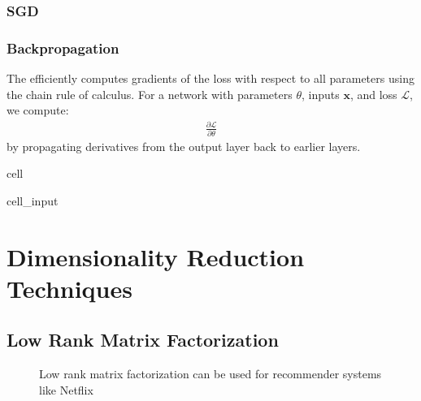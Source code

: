 \documentclass[letterpaper,10pt,english]{jupyterBook}
\let\sphinxpxdimen\pdfpxdimen\else\newdimen\sphinxpxdimen
\begin{document}
\subsection{SGD}
\label{\detokenize{neuralnets_optimization:sgd}}

\subsection{Backpropagation}
\label{\detokenize{neuralnets_optimization:backpropagation}}
\sphinxAtStartPar
The  efficiently computes gradients of the loss with respect to all parameters using the chain rule of calculus. For a network with parameters \( \theta \), inputs \( \mathbf{x} \), and loss \( \mathcal{L} \), we compute:
\begin{equation*}
\begin{split}
\frac{\partial \mathcal{L}}{\partial \theta}
\end{split}
\end{equation*}
\sphinxAtStartPar
by propagating derivatives from the output layer back to earlier layers.

\begin{sphinxuseclass}{cell}\begin{sphinxVerbatimInput}

\begin{sphinxuseclass}{cell_input}
\begin{sphinxVerbatim}[commandchars=\\\{\}]
\end{sphinxVerbatim}

\end{sphinxuseclass}\end{sphinxVerbatimInput}

\end{sphinxuseclass}
\sphinxstepscope


\chapter{Dimensionality Reduction Techniques}
\label{\detokenize{dim_reduction:dimensionality-reduction-techniques}}\label{\detokenize{dim_reduction::doc}}
\sphinxstepscope


\section{Low Rank Matrix Factorization}
\label{\detokenize{dim_reduction_mf:low-rank-matrix-factorization}}\label{\detokenize{dim_reduction_mf::doc}}
\begin{figure}[htbp]
\centering
\capstart

\noindent\sphinxincludegraphics[height=300\sphinxpxdimen]{{Netflix_Screenshot}.png}
\caption{Low rank matrix factorization can be used for recommender systems like Netflix}\label{\detokenize{dim_reduction_mf:netflix}}\end{figure}
\end{document}
